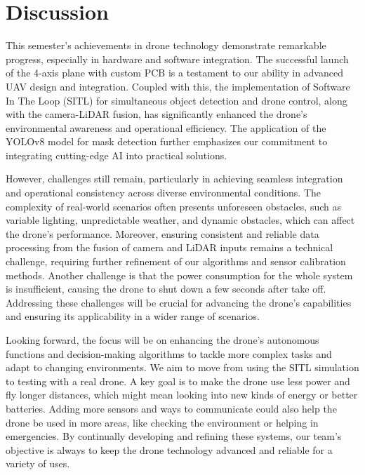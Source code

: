 \section{Discussion}

This semester's achievements in drone technology demonstrate remarkable progress, especially in hardware and software integration. The successful launch of the 4-axis plane with custom PCB is a testament to our ability in advanced UAV design and integration. Coupled with this, the implementation of Software In The Loop (SITL) for simultaneous object detection and drone control, along with the camera-LiDAR fusion, has significantly enhanced the drone's environmental awareness and operational efficiency. The application of the YOLOv8 model for mask detection further emphasizes our commitment to integrating cutting-edge AI into practical solutions.

However, challenges still remain, particularly in achieving seamless integration and operational consistency across diverse environmental conditions. The complexity of real-world scenarios often presents unforeseen obstacles, such as variable lighting, unpredictable weather, and dynamic obstacles, which can affect the drone's performance. Moreover, ensuring consistent and reliable data processing from the fusion of camera and LiDAR inputs remains a technical challenge, requiring further refinement of our algorithms and sensor calibration methods. Another challenge is that the power consumption for the whole system is insufficient, causing the drone to shut down a few seconds after take off. Addressing these challenges will be crucial for advancing the drone's capabilities and ensuring its applicability in a wider range of scenarios.

Looking forward, the focus will be on enhancing the drone's autonomous functions and decision-making algorithms to tackle more complex tasks and adapt to changing environments. We aim to move from using the SITL simulation to testing with a real drone. A key goal is to make the drone use less power and fly longer distances, which might mean looking into new kinds of energy or better batteries. Adding more sensors and ways to communicate could also help the drone be used in more areas, like checking the environment or helping in emergencies. By continually developing and refining these systems, our team's objective is always to keep the drone technology advanced and reliable for a variety of uses.

